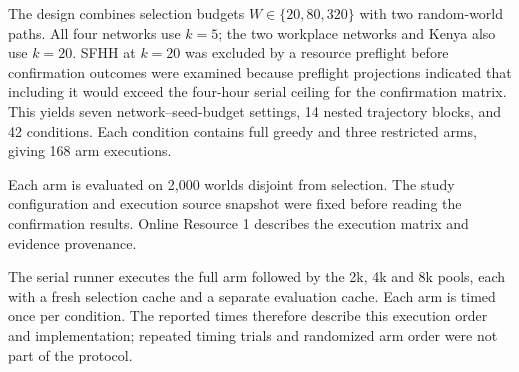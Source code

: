 \documentclass[smallextended]{svjour3}
\begin{document}
The design combines selection budgets \(W\in \{20,80,320\}\) with two random-world paths. All four networks use \(k=5\); the two workplace networks and Kenya also use \(k=20\). SFHH at \(k=20\) was excluded by a resource preflight before confirmation outcomes were examined because preflight projections indicated that including it would exceed the four-hour serial ceiling for the confirmation matrix. This yields seven network--seed-budget settings, 14 nested trajectory blocks, and 42 conditions. Each condition contains full greedy and three restricted arms, giving 168 arm executions.

Each arm is evaluated on 2,000 worlds disjoint from selection. The study configuration and execution source snapshot were fixed before reading the confirmation results. Online Resource 1 describes the execution matrix and evidence provenance.

The serial runner executes the full arm followed by the 2k, 4k and 8k pools, each with a fresh selection cache and a separate evaluation cache. Each arm is timed once per condition. The reported times therefore describe this execution order and implementation; repeated timing trials and randomized arm order were not part of the protocol.
\end{document}
